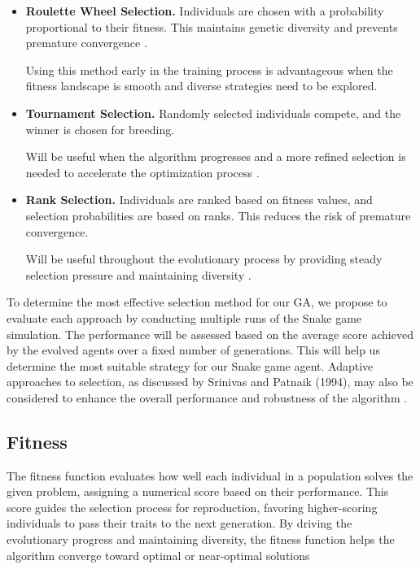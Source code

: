 \documentclass[a4paper, twocolumn]{article}
\begin{document}
\begin{itemize}
\item \textbf{Roulette Wheel Selection.}
Individuals are chosen with a probability proportional to their fitness. This maintains genetic diversity and prevents premature convergence \cite{goldberg1991comparative}.
        
Using this method early in the training process is advantageous when the fitness landscape is smooth and diverse strategies need to be explored.

\item \textbf{Tournament Selection.}
Randomly selected individuals compete, and the winner is chosen for breeding.

Will be useful when the algorithm progresses and a more refined selection is needed to accelerate the optimization process \cite{goldberg1991comparative}.

\item \textbf{Rank Selection.}
Individuals are ranked based on fitness values, and selection probabilities are based on ranks. This reduces the risk of premature convergence.

Will be useful throughout the evolutionary process by providing steady selection pressure and maintaining diversity \cite{srinvas1994adaptive}.

\end{itemize}

To determine the most effective selection method for our GA, we propose to evaluate each approach by conducting multiple runs of the Snake game simulation. The performance will be assessed based on the average score achieved by the evolved agents over a fixed number of generations. This will help us determine the most suitable strategy for our Snake game agent. Adaptive approaches to selection, as discussed by Srinivas and Patnaik (1994), may also be considered to enhance the overall performance and robustness of the algorithm \cite{srinvas1994adaptive}.

\subsection{Fitness\label{sec:Fitness}}
The fitness function evaluates how well each individual in a population solves the given problem, assigning a numerical score based on their performance. This score guides the selection process for reproduction, favoring higher-scoring individuals to pass their traits to the next generation. By driving the evolutionary progress and maintaining diversity, the fitness function helps the algorithm converge toward optimal or near-optimal solutions
\end{document}
